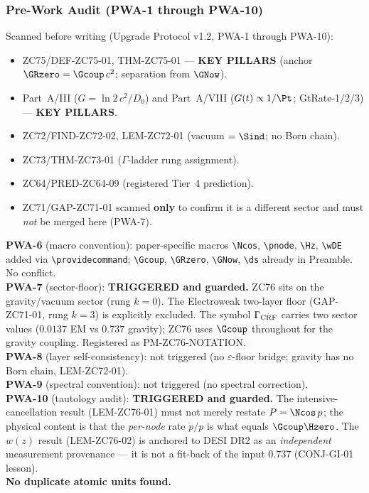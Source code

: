 \documentclass[12pt, a4paper]{article}
\begin{document}
\subsubsection{Pre-Work Audit (PWA-1 through PWA-10)}

\begin{formalbox}[title={Pre-Work Audit Record --- ZC76}]
Scanned before writing (Upgrade Protocol v1.2, PWA-1 through PWA-10):
\begin{itemize}[leftmargin=2em, noitemsep]
  \item ZC75/DEF-ZC75-01, THM-ZC75-01 --- \textbf{KEY PILLARS}
    (anchor $\GRzero = \Gcoup\,c^2$; separation from $\GNow$).
  \item Part~A/III ($G = \ln2\,c^2/D_0$) and Part~A/VIII
    ($G(t)\propto 1/\Pt$; GtRate-1/2/3) --- \textbf{KEY PILLARS}.
  \item ZC72/FIND-ZC72-02, LEM-ZC72-01 (vacuum $= \Sind$; no Born chain).
  \item ZC73/THM-ZC73-01 ($\Gamma$-ladder rung assignment).
  \item ZC64/PRED-ZC64-09 (registered Tier~4 prediction).
  \item ZC71/GAP-ZC71-01 scanned \textbf{only} to confirm it is a
    different sector and must \emph{not} be merged here (PWA-7).
\end{itemize}

\textbf{PWA-6} (macro convention): paper-specific macros
\texttt{\textbackslash Ncos}, \texttt{\textbackslash pnode},
\texttt{\textbackslash Hz}, \texttt{\textbackslash wDE} added via
\texttt{\textbackslash providecommand}; \texttt{\textbackslash Gcoup},
\texttt{\textbackslash GRzero}, \texttt{\textbackslash GNow},
\texttt{\textbackslash ds} already in Preamble. No conflict.\\
\textbf{PWA-7} (sector-floor): \textbf{TRIGGERED and guarded.}
ZC76 sits on the gravity/vacuum sector (rung $k=0$). The Electroweak
two-layer floor (GAP-ZC71-01, rung $k=3$) is explicitly excluded.
The symbol $\Gamma_{\rm CRF}$ carries two sector values
($0.0137$ EM vs $0.737$ gravity); ZC76 uses $\Gcoup$ throughout for the
gravity coupling. Registered as PM-ZC76-NOTATION.\\
\textbf{PWA-8} (layer self-consistency): not triggered (no
$\varepsilon$-floor bridge; gravity has no Born chain, LEM-ZC72-01).\\
\textbf{PWA-9} (spectral convention): not triggered (no spectral
correction).\\
\textbf{PWA-10} (tautology audit): \textbf{TRIGGERED and guarded.}
The intensive-cancellation result (LEM-ZC76-01) must not merely restate
$P = \Ncos\,p$; the physical content is that the \emph{per-node} rate
$\dot{p}/p$ is what equals $\Gcoup\Hzero$. The $w(z)$ result
(LEM-ZC76-02) is anchored to DESI DR2 as an \emph{independent}
measurement provenance --- it is not a fit-back of the input $0.737$
(CONJ-GI-01 lesson).\\
\textbf{No duplicate atomic units found.}
\end{formalbox}
\end{document}

